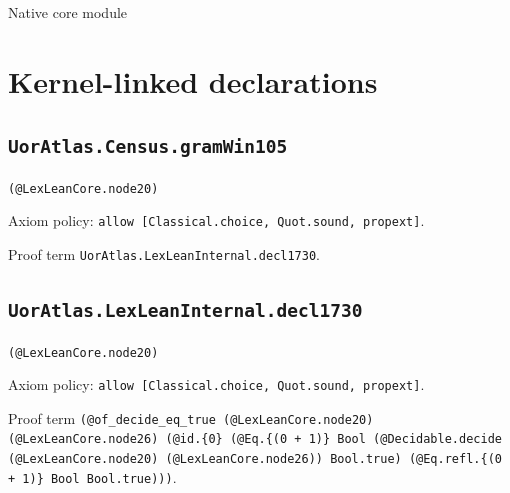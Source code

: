 \documentclass[11pt]{article}
\begin{document}
\begin{center}{\LARGE Native core module}\end{center}
\section*{Kernel-linked declarations}
\subsection*{\texttt{UorAtlas.Census.gramWin105}}
\noindent\texttt{(@LexLeanCore.node20)}\par
\noindent Axiom policy: \texttt{allow [Classical.choice, Quot.sound, propext]}.\par
\noindent Proof term \texttt{UorAtlas.LexLeanInternal.decl1730}.\par
\subsection*{\texttt{UorAtlas.LexLeanInternal.decl1730}}
\noindent\texttt{(@LexLeanCore.node20)}\par
\noindent Axiom policy: \texttt{allow [Classical.choice, Quot.sound, propext]}.\par
\noindent Proof term \texttt{(@of\_decide\_eq\_true (@LexLeanCore.node20) (@LexLeanCore.node26) (@id.\{0\} (@Eq.\{(0 + 1)\} Bool (@Decidable.decide (@LexLeanCore.node20) (@LexLeanCore.node26)) Bool.true) (@Eq.refl.\{(0 + 1)\} Bool Bool.true)))}.\par
\end{document}
